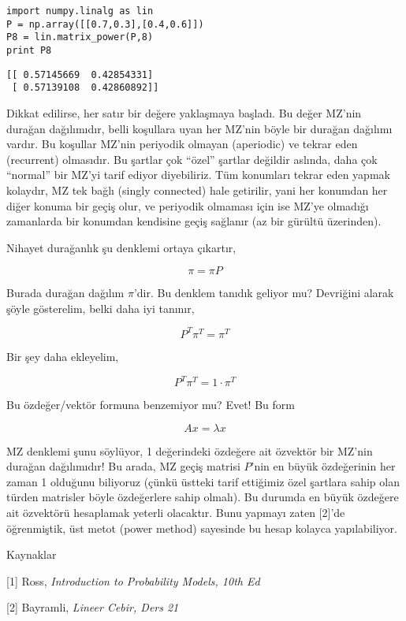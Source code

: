 \documentclass[12pt,fleqn]{article}\usepackage{../../common}
\begin{document}
\begin{verbatim}
import numpy.linalg as lin
P = np.array([[0.7,0.3],[0.4,0.6]])
P8 = lin.matrix_power(P,8)
print P8
\end{verbatim}

\begin{verbatim}
[[ 0.57145669  0.42854331]
 [ 0.57139108  0.42860892]]
\end{verbatim}

Dikkat edilirse, her satır bir değere yaklaşmaya başladı. Bu değer MZ'nin
durağan dağılımıdır, belli koşullara uyan her MZ'nin böyle bir durağan
dağılımı vardır. Bu koşullar MZ'nin periyodik olmayan (aperiodic) ve tekrar
eden (recurrent) olmasıdır. Bu şartlar çok ``özel'' şartlar değildir
aslında, daha çok ``normal'' bir MZ'yi tarif ediyor diyebiliriz. Tüm
konumları tekrar eden yapmak kolaydır, MZ tek bağlı (singly connected) hale
getirilir, yani her konumdan her diğer konuma bir geçiş olur, ve periyodik
olmaması için ise MZ'ye olmadığı zamanlarda bir konumdan kendisine geçiş
sağlanır (az bir gürültü üzerinden). 

Nihayet durağanlık şu denklemi ortaya çıkartır,

$$ \pi = \pi P $$

Burada durağan dağılım $\pi$'dir. Bu denklem tanıdık geliyor mu?  Devriğini
alarak şöyle gösterelim, belki daha iyi tanınır, 

$$ P^T\pi^T = \pi^T $$

Bir şey daha ekleyelim, 

$$ P^T\pi^T = 1 \cdot \pi^T $$

Bu özdeğer/vektör formuna benzemiyor mu? Evet! Bu form 

$$ Ax = \lambda x $$

MZ denklemi şunu söylüyor, 1 değerindeki özdeğere ait özvektör bir MZ'nin
durağan dağılımıdır! Bu arada, MZ geçiş matrisi $P$'nin en büyük
özdeğerinin her zaman 1 olduğunu biliyoruz (çünkü üstteki tarif ettiğimiz
özel şartlara sahip olan türden matrisler böyle özdeğerlere sahip
olmalı). Bu durumda en büyük özdeğere ait özvektörü hesaplamak yeterli
olacaktır. Bunu yapmayı zaten [2]'de öğrenmiştik, üst metot (power method)
sayesinde bu hesap kolayca yapılabiliyor.



Kaynaklar

[1] Ross, {\em Introduction to Probability Models, 10th Ed}

[2] Bayramli, {\em Lineer Cebir, Ders 21}
\end{document}
